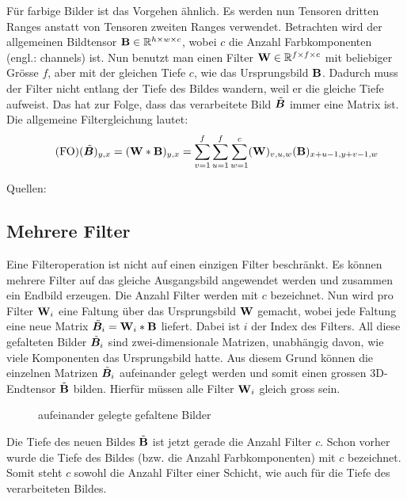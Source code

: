 \para{}
Für farbige Bilder ist das Vorgehen ähnlich. Es werden nun
Tensoren dritten Ranges anstatt von Tensoren zweiten Ranges verwendet.
Betrachten wird der allgemeinen Bildtensor $\mathbf{B} \in \mathbb{R}^{h \times w
  \times c}$, wobei $c$ die Anzahl Farbkomponenten (engl.: channels) ist.
Nun benutzt man einen Filter $\mathbf{W} \in \mathbb{R}^{f \times f \times c}$ mit beliebiger Grösse
$f$, aber mit der gleichen Tiefe $c$, wie das Ursprungsbild $\mathbf{B}$.
Dadurch muss der Filter nicht entlang der Tiefe des Bildes wandern, weil er
die gleiche Tiefe aufweist. Das hat zur Folge, dass das verarbeitete
Bild $\tilde{\bm{B}}$ immer eine Matrix ist.
Die allgemeine Filtergleichung lautet:
\\
\begin{equation}\tag{FO}
  (\tilde{\bm{B}})_{y,x} = (\mathbf{W} * \mathbf{B})_{y,x} = \sum_{v=1}^{f} \sum_{u=1}^{f} \sum_{w=1}^c (\mathbf{W})_{v,u,w} (\mathbf{B})_{x+u-1,y+v-1,w}
\end{equation}

\para{}
Quellen: \cite{Goodfellow-et-al-2016} \cite{deeplearning.ai:cnn} \cite{wiki:cnn}

\subsection{Mehrere Filter}
Eine Filteroperation ist nicht auf einen einzigen Filter beschränkt. Es können
mehrere Filter auf das gleiche Ausgangsbild angewendet werden und zusammen ein
Endbild erzeugen.
\para{}
Die Anzahl Filter werden mit $c$ bezeichnet.
Nun wird pro Filter $\mathbf{W}_i$ eine Faltung über das Ursprungsbild $\mathbf{W}$ gemacht, wobei
jede Faltung eine neue Matrix $\tilde{\bm{B}}_i = \mathbf{W}_i * \mathbf{B}$ liefert.
Dabei ist $i$ der Index des Filters. All diese gefalteten Bilder
$\tilde{\bm{B}}_i$ sind zwei-dimensionale Matrizen, unabhängig davon, wie viele
Komponenten das Ursprungsbild hatte. Aus diesem Grund können die einzelnen
Matrizen $\tilde{\bm{B}}_i$ aufeinander gelegt werden und somit einen grossen 3D-Endtensor
$\tilde{\mathbf{B}}$ bilden.
Hierfür müssen alle Filter $\mathbf{W}_i$ gleich gross sein.
\begin{figure}[h!]
  \caption{aufeinander gelegte gefaltene Bilder}
\end{figure}
Die Tiefe des neuen Bildes $\tilde{\mathbf{B}}$ ist jetzt gerade die Anzahl Filter $c$.
Schon vorher wurde die Tiefe des Bildes (bzw. die Anzahl
Farbkomponenten) mit $c$ bezeichnet. Somit steht $c$ sowohl die Anzahl Filter
einer Schicht, wie auch für die Tiefe des verarbeiteten Bildes.

